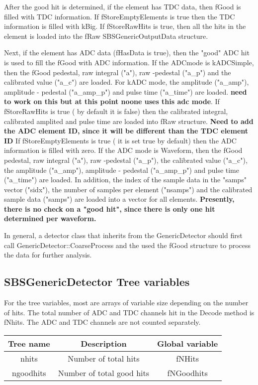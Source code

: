 \documentclass[11pt]{article}
\begin{document}
After the good hit is determined, if the element has TDC data, then fGood is filled with TDC information. If  fStoreEmptyElements is true then the TDC information is filled with kBig. If fStoreRawHits is true, then all the hits in the element is
loaded into the fRaw SBSGenericOutputData structure.

Next, if the element has ADC data (fHasData is true), then the "good" ADC 
hit is used to fill the fGood with ADC information.
If the ADCmode is kADCSimple, then the fGood pedestal, raw integral ("a"), raw -pedestal ("a\_p")
and the calibrated value ("a\_c") are loaded. For kADC mode, the amplitude ("a\_amp"),
amplitude - pedestal ("a\_amp\_p") and pulse time ("a\_time") are loaded. {\bf need to work on this but at this point noone uses this adc mode}. If fStoreRawHits is true ( by default it is false) then the calibrated integral,
calibrated amplited and pulse time are loaded into fRaw structure. {\bf Need to add the ADC element ID, since it will be different than the TDC element ID}
 If  fStoreEmptyElements is true ( it is set true by default) then the ADC information is filled with zero.
 If the ADC mode is Waveform, then the  fGood pedestal, raw integral ("a"), raw -pedestal ("a\_p"), 
 the calibrated value ("a\_c"), the amplitude ("a\_amp"),
 amplitude - pedestal ("a\_amp\_p") and pulse time ("a\_time") are loaded. In addition, the
 index of the sample data in the "samps" vector ("sidx"), the number of samples per element ("nsamps") and the
 calibrated sample data ("samps") are loaded into a vector for all elements.
 {\bf Presently, there is no check on a "good hit", since there is only one hit determined per waveform.}
 
 In general, a detector class that inherits from the GenericDetector should first call GenericDetector::CoarseProcess and the used the fGood structure to process the data for 
 further analysis.
 

 
 

\subsection{SBSGenericDetector Tree variables}

For the tree variables, most are arrays of variable size depending on the number of hits. 
The total number of  ADC and TDC channels hit in the Decode method is fNhits. The ADC and TDC channels
are not counted separately.
\begin{center}
	\begin{tabular}{|c|c|c|}
		\hline 
		Tree name	& Description &  Global variable\\ 
		\hline 
		nhits	& Number of total hits & fNHits  \\ 
		\hline 
		ngoodhits	& Number of total good hits & fNGoodhits \\ 
		\hline 
\end{tabular} 
\end{center}
\end{document}
